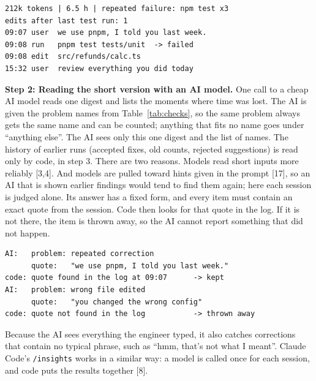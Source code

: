 \documentclass[10pt,twocolumn]{article}
\begin{document}
\begin{lstlisting}
212k tokens | 6.5 h | repeated failure: npm test x3
edits after last test run: 1
09:07 user  we use pnpm, I told you last week.
09:08 run   pnpm test tests/unit  -> failed
09:08 edit  src/refunds/calc.ts
15:32 user  review everything you did today
\end{lstlisting}

\textbf{Step 2: Reading the short version with an AI model.} One call to a cheap AI model reads one digest and lists the moments where time was lost. The AI is given the problem names from Table~\ref{tab:checks}, so the same problem always gets the same name and can be counted; anything that fits no name goes under ``anything else''. The AI sees only this one digest and the list of names. The history of earlier runs (accepted fixes, old counts, rejected suggestions) is read only by code, in step 3. There are two reasons. Models read short inputs more reliably [3,4]. And models are pulled toward hints given in the prompt [17], so an AI that is shown earlier findings would tend to find them again; here each session is judged alone. Its answer has a fixed form, and every item must contain an exact quote from the session. Code then looks for that quote in the log. If it is not there, the item is thrown away, so the AI cannot report something that did not happen.

\begin{lstlisting}
AI:   problem: repeated correction
      quote:   "we use pnpm, I told you last week."
code: quote found in the log at 09:07      -> kept
AI:   problem: wrong file edited
      quote:   "you changed the wrong config"
code: quote not found in the log           -> thrown away
\end{lstlisting}

 Because the AI sees everything the engineer typed, it also catches corrections that contain no typical phrase, such as ``hmm, that's not what I meant''. Claude Code's \texttt{/insights} works in a similar way: a model is called once for each session, and code puts the results together [8].
\end{document}

